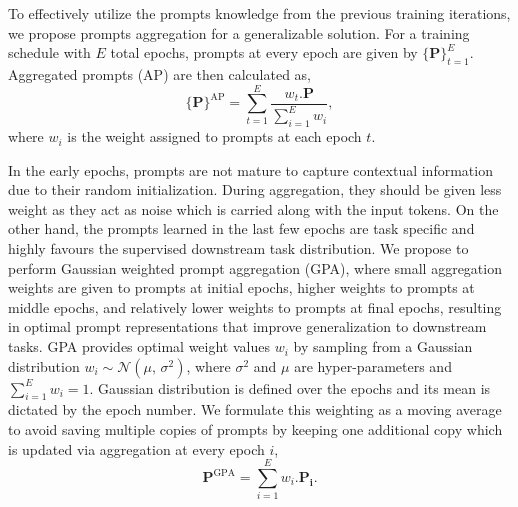 \documentclass[10pt,twocolumn,letterpaper]{article}
\begin{document}
To effectively utilize the prompts knowledge from the previous training iterations, we propose prompts aggregation for a generalizable solution. For a training schedule with $E$ total epochs, prompts at every epoch are given by $\{{\bm{P}\}}_{t=1}^{E}$. Aggregated prompts (AP) are then calculated as,
\begin{equation}
\label{eq:p-tuning}
    \{\bm{P}\}^{\text{AP}} = \sum_{t=1}^{E}{\frac{w_{t} . \bm{P}}{\sum_{i=1}^{E}w_{i}}},
\end{equation}
where $w_{i}$ is the weight assigned to prompts at each epoch $t$. 

In the early epochs, prompts are not mature to capture contextual information due to their random initialization. During aggregation, they should be given less weight as they act as noise which is carried along with the input tokens. On the other hand, the prompts learned in the last few epochs are task specific and highly favours the supervised downstream task distribution. We propose to perform Gaussian weighted prompt aggregation (GPA), where small aggregation weights are given to prompts at initial epochs, higher weights to prompts at middle epochs, and relatively lower weights to prompts at final epochs, resulting in optimal prompt representations that improve generalization to downstream tasks. GPA provides optimal weight values $w_{i}$ by sampling from a Gaussian distribution $w_{i} \sim \mathcal{N}(\mu,\,\sigma^{2})$, where $\sigma^{2}$ and $\mu$ are hyper-parameters and $\sum_{i=1}^{E}w_{i}=1$. Gaussian distribution is defined over the epochs and its mean is dictated by the epoch number. We formulate this weighting as a moving average to avoid saving multiple copies of prompts by keeping one additional copy which is updated via aggregation at every epoch $i$,
\begin{equation}
\label{eq:moving_average}
    {\bm{P}}^{\text{GPA}} =  \sum_{i=1}^{E}w_{i} . \bm{P_{i}}.
\end{equation}
\end{document}
